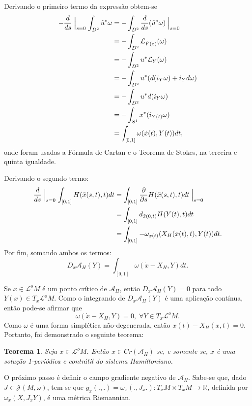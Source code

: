 \documentclass[12pt]{book}
\newtheorem{teorema}{Teorema}[section]
\newcommand{\campohamiltonianoabrev}{X_{H}}
\newcommand{\circulo}{S^{1}}
\newcommand{\derivadaparcial}[2]{\frac{\partial #1}{\partial #2}}
\newcommand{\espacotangenteponto}[2]{T_{#1}#2}
\newcommand{\estruturascomplexas}[2]{\mathcal{J}(#1, #2)}
\newcommand{\funcionalH}{\mathcal{A}_{H}}
\newcommand{\pontoscriticos}[1]{\textit{Cr}(#1)}
\newcommand{\real}[1]{\mathbb{R}^{#1}}
\newcommand{\reta}{\real{}}
\newcommand{\lacocontrateis}{\mathcal{L}^{o}M}
\begin{document}
	Derivando o primeiro termo da expressão obtem-se
	$$
	\begin{aligned}
	-\frac{d}{ds} \Bigm\lvert_{s=0} \int_{D^{2}}\tilde{u}^{*}\omega 
	&=-\int_{D^{2}}\frac{d}{ds} (\tilde{u}^{*}\omega)\Bigm\lvert_{s=0} \\
	&=-\int_{D^{2}} \mathcal{L}_{\tilde{Y}(z)}(\omega)
	\\
	&=-\int_{D^{2}}u^{*} \mathcal{L}_{Y}(\omega)
	\\
	&=-\int_{D^{2}}u^{*} (d(i_{Y}\omega) + i_{Y}d\omega)
	\\
	&=-\int_{D^{2}}u^{*} d(i_{Y}\omega)
	\\
	&=-\int_{\circulo}	x^{*} (i_{Y(t)}\omega)
	\\
	&= \int_{[0,1]} \omega(\dot{x}(t), Y(t))dt,
	\end{aligned}
	$$
	onde foram usadas a Fórmula de Cartan e o Teorema de Stokes, na terceira e quinta igualdade.
	
	Derivando o segundo termo:
	$$
	\begin{aligned}
	\frac{d}{ds} \Bigm\lvert_{s=0} \int_{[0,1]} H(\tilde{x}(s,t),t)dt 
	&= \int_{[0,1]} \derivadaparcial{}{s} H(\tilde{x}(s,t),t)dt \Bigm\lvert_{s=0}
	\\
	&= \int_{[0,1]} d_{\tilde{x}(0,t)}H(Y(t),t)dt
	\\
	&= \int_{[0,1]} -\omega_{x(t)}(\campohamiltonianoabrev(x(t), t), Y(t))dt. 
	\end{aligned}
	$$
	Por fim, somando ambos os termos:
	$$
	D_{x}\funcionalH(Y) = \int_{[0,1]} \omega(\dot{x} - \campohamiltonianoabrev, Y)dt.
	$$
	
	Se $x \in \lacocontrateis$ é um ponto crítico de $\funcionalH$, então $D_{x}\funcionalH(Y) = 0 $ para todo $Y(x) \in \espacotangenteponto{x}{\lacocontrateis}$. Como o integrando de $D_{x}\funcionalH(Y)$ é uma aplicação contínua, então pode-se afirmar que
	$$
	\omega(\dot{x} - \campohamiltonianoabrev, Y)=0,\; \forall Y \in \espacotangenteponto{x}{\lacocontrateis}.
	$$
	Como $\omega$ é uma forma simplética não-degenerada, então $\dot{x}(t) - \campohamiltonianoabrev(x, t)=0$. Portanto, foi demonstrado o seguinte teorema:
	
	\begin{teorema}
		Seja $x \in \lacocontrateis$. Então $x \in \pontoscriticos{\funcionalH}$ se, e somente se, $x$ é uma solução 1-periódica e contrátil do sistema Hamiltoniano.
	\end{teorema}
	
	O próximo passo é definir o campo gradiente negativo de $\funcionalH$. Sabe-se que, dado $J \in \estruturascomplexas{M}{\omega}$, tem-se que $g_{x}(., .)=\omega_{x}(.,J_{x}.):T_{x}M\times T_{x}M \to \reta$, definida por $\omega_{x}(X,J_{x}Y)$, é uma métrica Riemannian.
	
\end{document}

